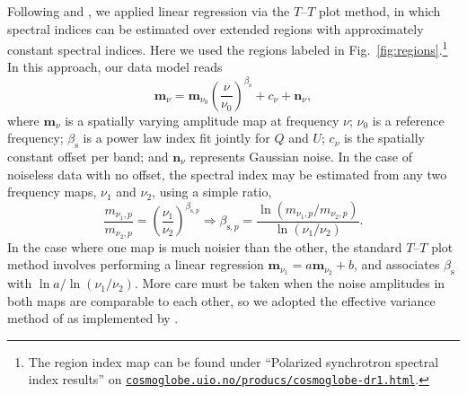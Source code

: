 \documentclass[twocolumn]{../../common/aa}
\newcommand{\Cosmoglobe}{\textsc{Cosmoglobe}}
\begin{document}
Following \citet{fuskeland2014} and \citet{fuskeland:2019}, we applied linear regression via the $T$--$T$ plot method, in which spectral indices can be estimated over extended regions with approximately constant spectral indices. Here we used the regions labeled in Fig.~\ref{fig:regions}.\footnote{The region index map can be found under ``Polarized synchrotron spectral index results'' on \href{https://www.cosmoglobe.uio.no/products/cosmoglobe-dr1.html}{\texttt{cosmoglobe.uio.no/producs/cosmoglobe-dr1.html}}.}
 In this approach, our data model reads
\begin{equation}
	\boldsymbol m_\nu = \boldsymbol m_{\nu_0}\left(\frac\nu{\nu_0}\right)^{\beta_\mathrm s}+c_\nu+\boldsymbol n_\nu ,
\end{equation}
where $\boldsymbol m_\nu$ is a spatially varying amplitude map at frequency $\nu$; $\nu_0$ is a reference frequency; $\beta_\mathrm s$ is a power law index fit jointly for $Q$ and $U$; $c_\nu$ is the spatially constant offset per band; and $\boldsymbol n_\nu$ represents Gaussian noise. In the case of noiseless data with no offset, the spectral index may be estimated from any two frequency maps, $\nu_1$ and $\nu_2$, using a simple ratio,
\begin{equation}
	\frac{m_{\nu_1,p}}{m_{\nu_2,p}}
	=\left(\frac{\nu_1}{\nu_2}\right)^{\beta_{\mathrm s,p}}
	\Rightarrow
	\beta_{\mathrm s,p}=\frac{\ln(m_{\nu_1,p}/m_{\nu_2,p})}{\ln(\nu_1/\nu_2)}.
\end{equation}
In the case where one map is much noisier than the other, the standard $T$--$T$ plot method involves performing  a linear regression $\boldsymbol m_{\nu_1}=a\boldsymbol m_{\nu_2}+b$, and associates $\beta_\mathrm s$ with $\ln a/\ln(\nu_1/\nu_2)$. More care must be taken when the noise amplitudes in both maps are comparable to each other, so we adopted the effective variance method of \citet{orear1982} as implemented by \citet{fuskeland2014}.






%
\end{document}

